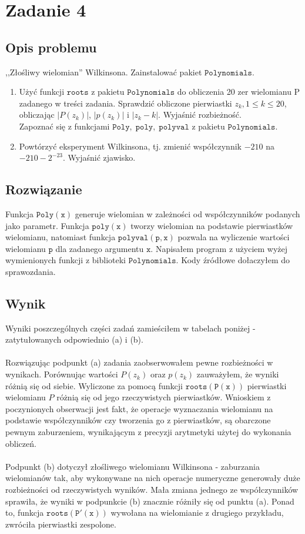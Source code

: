 \section{Zadanie 4}
\subsection{Opis problemu}
,,Złośliwy wielomian'' Wilkinsona. Zainstalować pakiet $ \mathtt{Polynomials} $.
\begin{enumerate}[label=(\alph*)]
  \item Użyć funkcji $ \mathtt{roots} $ z pakietu $ \mathtt{Polynomials} $ do obliczenia 20 zer wielomianu P zadanego w treści zadania. Sprawdzić obliczone pierwiastki $ z_k, 1 \leq k \leq 20 $, obliczając $|P(z_k)|$, $|p(z_k)|$ i $|z_k - k|$. Wyjaśnić rozbieżność. \\
  Zapoznać się z funkcjami $ \mathtt{Poly},\; \mathtt{poly},\; \mathtt{polyval}$ z pakietu $ \mathtt{Polynomials} $.
  \item Powtórzyć eksperyment Wilkinsona, tj. zmienić współczynnik $-210$ na $ -210-2^{-23}$. Wyjaśnić zjawisko.
\end{enumerate}
\subsection{Rozwiązanie}
Funkcja $ \mathtt{Poly(x)} $ generuje wielomian w zależności od współczynników podanych jako parametr.
Funkcja $ \mathtt{poly(x)} $ tworzy wielomian na podstawie pierwiastków wielomianu, natomiast funkcja $ \mathtt{polyval(p, x)} $ pozwala na wyliczenie wartości wielomianu $ \mathtt{p} $ dla zadanego argumentu $ \mathtt{x} $. Napisałem program z użyciem wyżej wymienionych funkcji z biblioteki $ \mathtt{Polynomials} $. Kody źródłowe dołaczyłem do sprawozdania. 

\subsection{Wynik}
Wyniki poszczególnych części zadań zamieściłem w tabelach poniżej - zatytułowanych odpowiednio (a) i (b). \\\\
Rozwiązując podpunkt (a) zadania zaobserwowałem pewne rozbieżności w wynikach. 
Porównując wartości $ P(z_k) $ oraz $ p(z_k) $ zauważyłem, że wyniki różnią się od siebie. 
Wyliczone za pomocą funkcji $ \mathtt{roots(P(x))} $ pierwiastki wielomianu $ P $ różnią się od jego rzeczywistych pierwiastków. Wnioskiem z poczynionych obserwacji jest fakt, że operacje wyznaczania wielomianu na podstawie współczynników czy tworzenia go z pierwiastków, są obarczone pewnym zaburzeniem, wynikającym z precyzji arytmetyki użytej do wykonania obliczeń. \\\\
Podpunkt (b) dotyczył złośliwego wielomianu Wilkinsona - zaburzania wielomianów tak, aby wykonywane na nich operacje numeryczne generowały duże rozbieżności od rzeczywistych wyników. Mała zmiana jednego ze współczynników sprawiła, że wyniki w podpunkcie (b) znacznie różniły się od punktu (a). Ponad to, funkcja $ \mathtt{roots(P'(x))} $ wywołana na wielomianie z drugiego przykładu, zwróciła pierwiastki zespolone.

\begin{center}
  
\end{center}